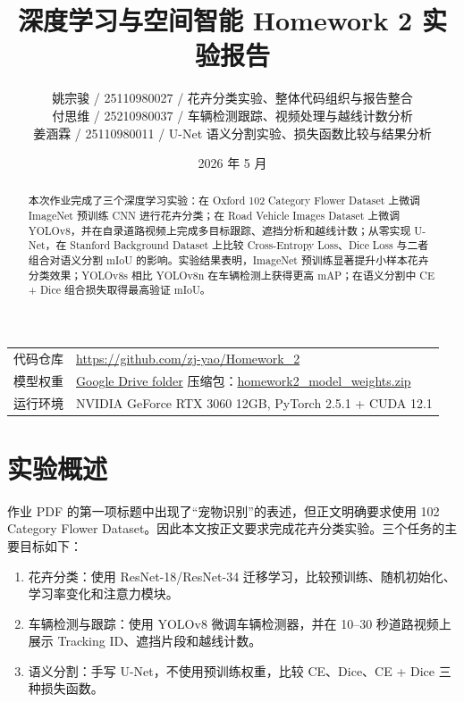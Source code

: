 \documentclass[UTF8,a4paper,11pt]{ctexart}
\title{深度学习与空间智能 Homework 2 实验报告}
\author{
  姚宗骏 / 25110980027 / 花卉分类实验、整体代码组织与报告整合\\
  付思维 / 25210980037 / 车辆检测跟踪、视频处理与越线计数分析\\
  姜涵霖 / 25110980011 / U-Net 语义分割实验、损失函数比较与结果分析
}
\date{2026 年 5 月}
\begin{document}
\maketitle

\begin{center}
\begin{tabularx}{\textwidth}{lX}
\toprule
代码仓库 & \href{https://github.com/zj-yao/Homework_2}{https://github.com/zj-yao/Homework\_2}\\
模型权重 & \href{https://drive.google.com/drive/folders/1GpObjJP_6nYOdDF8HlNkBnlWKpdh7mBl?usp=sharing}{Google Drive folder}\newline
压缩包：\href{https://drive.google.com/open?id=178zInJjSr-Ue0lw0Fc0YVSLJvls1ZG4E}{homework2\_model\_weights.zip}\\
运行环境 & NVIDIA GeForce RTX 3060 12GB, PyTorch 2.5.1 + CUDA 12.1\\
\bottomrule
\end{tabularx}
\end{center}

\begin{abstract}
本次作业完成了三个深度学习实验：在 Oxford 102 Category Flower Dataset 上微调 ImageNet 预训练 CNN 进行花卉分类；在 Road Vehicle Images Dataset 上微调 YOLOv8，并在自录道路视频上完成多目标跟踪、遮挡分析和越线计数；从零实现 U-Net，在 Stanford Background Dataset 上比较 Cross-Entropy Loss、Dice Loss 与二者组合对语义分割 mIoU 的影响。实验结果表明，ImageNet 预训练显著提升小样本花卉分类效果；YOLOv8s 相比 YOLOv8n 在车辆检测上获得更高 mAP；在语义分割中 CE + Dice 组合损失取得最高验证 mIoU。
\end{abstract}

\section{实验概述}

作业 PDF 的第一项标题中出现了“宠物识别”的表述，但正文明确要求使用 102 Category Flower Dataset。因此本文按正文要求完成花卉分类实验。三个任务的主要目标如下：

\begin{enumerate}
  \item 花卉分类：使用 ResNet-18/ResNet-34 迁移学习，比较预训练、随机初始化、学习率变化和注意力模块。
  \item 车辆检测与跟踪：使用 YOLOv8 微调车辆检测器，并在 10--30 秒道路视频上展示 Tracking ID、遮挡片段和越线计数。
  \item 语义分割：手写 U-Net，不使用预训练权重，比较 CE、Dice、CE + Dice 三种损失函数。
\end{enumerate}
\end{document}
